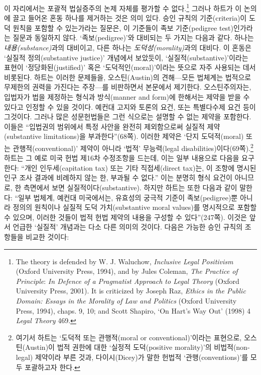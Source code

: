 \documentclass[12pt, oneside]{book}  %
\begin{document}
이 자리에서는 포괄적 법실증주의 논제 자체를 평가할 수 없다.\footnote{The
  theory is defended by W. J. Waluchow, \emph{Inclusive Legal
  Positivism} (Oxford University Press, 1994), and by Jules Coleman,
  \emph{The Practice of Principle}: \emph{In Defence of a Pragmatist
  Approach to Legal Theory} (Oxford University Press, 2001). It is
  criticized by Joseph Raz, \emph{Ethics in the Public Domain: Essays in
  the Morality of Law and Politics} (Oxford University Press, 1994),
  chaps. 9, 10; and Scott Shapiro, `On Hart's Way Out' (1998) 4
  \emph{Legal Theory} 469.} 그러나 하트가 이 논의에 끌고 들어온 혼동
하나를 제거하는 것은 의미 있다. 승인 규칙의 기준(criteria)이 도덕 원칙을
포함할 수 있는가라는 질문은, 이 기준들이 족보 기준(pedigree
test)인가라는 질문과 동일하지 않다. `족보(pedigree)'와 대비되는 두
가지는 다음과 같다. 하나는 \emph{내용(substance)}과의 대비이고, 다른
하나는 \emph{도덕성(morality)}과의 대비다. 이 혼동은 `실질적
정의(substantive justice)' 개념에서 보았듯이,
`실질적(substantive)'이라는 표현이 `정당화된(justified)' 혹은
`도덕적인(moral)'이라는 뜻으로 자주 사용되는 데서 비롯된다. 하트는
이러한 문제들을, 오스틴(Austin)의 견해---모든 법체계는 법적으로 무제한의
권력을 가진다는 주장---를 비판하면서 본문에서 제기한다. 오스틴주의자는,
입법자가 법을 제정하는 형식과 방식(manner and form)에 한해서는 제약을
받을 수 있다고 인정할 수 있을 것이다. 예컨대 고지와 토론의 요건, 또는
특별다수제 요건 등이 그것이다. 그러나 많은 성문헌법들은 그런 식으로는
설명할 수 없는 제약을 포함한다. 이들은 ``입법권의 범위에서 특정 사안을
완전히 제외함으로써 실질적 제약(substantive limitations)을
부과한다''(68쪽). 이러한 제약은 `단지 도덕적(moral) 또는
관행적(conventional)' 제약이 아니라 `법적' 무능력(legal
disabilities)이다(69쪽).\footnote{여기서 하트는 `도덕적 또는
  관행적(moral or conventional)'이라는 표현으로, 오스틴(Austin)이 법적
  권한에 대한 `실정적 도덕(positive morality)'의 비법적(non-legal)
  제약이라 부른 것과, 다이시(Dicey)가 말한 헌법적 `관행(conventions)'를
  모두 포괄하고자 한다.} 하트는 그 예로 미국 헌법 제16차 수정조항을
드는데, 이는 일부 내용으로 다음을 요구한다: ``개인 인두세(capitation
tax) 또는 기타 직접세(direct tax)는, 이 조항에 명시된 인구 조사 결과에
비례하지 않는 한, 부과될 수 없다.'' 이는 분명히 형식 요건이 아니므로, 한
측면에서 보면 실질적이다(substantive). 하지만 하트는 또한 다음과 같이
말한다: ``일부 법체계, 예컨대 미국에서는, 유효성의 궁극적 기준이
족보(pedigree)뿐 아니라 정의의 원칙이나 실질적 도덕 가치(substantive
moral values)를 명시적으로 포함할 수 있으며, 이러한 것들이 법적 헌법
제약의 내용을 구성할 수 있다''(247쪽). 이것은 앞서 언급한 `실질적'
개념과는 다소 다른 의미의 것이다. 다음은 가능한 승인 규칙의 조항들을
비교한 것이다:
\end{document}
